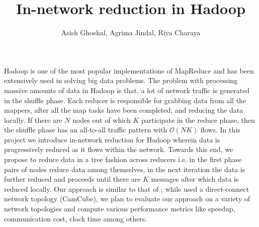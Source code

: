 \documentclass{article}      %
\title{In-network reduction in Hadoop}
\author{Asish Ghoshal, Agrima Jindal, Riya Charaya}
\date{}
\begin{document}

\maketitle                   %

\section*{}
Hadoop is one of the most popular implementations of MapReduce and has been extensively used in solving big data problems.
The problem with processing massive amounts of data in Hadoop is that, a lot of network traffic is generated in the shuffle phase.
Each reducer is responsible for grabbing data from all the mappers, after all the map tasks have been completed, and
reducing the data locally. If there are $N$ nodes out of which $K$ participate in the reduce phase, 
then the shuffle phase has an all-to-all traffic pattern with $\mathcal{O}(NK)$ flows.
In this project we introduce in-network reduction for Hadoop wherein data is progressively reduced as it
flows within the network. Towards this end, we propose to reduce data in a tree fashion across reducers i.e. in the first phase
pairs of nodes reduce data among themselves, in the next iteration the data is further reduced and proceeds until there are $K$
messages after which data is reduced locally. Our approach is similar to that of \citep{costa2012camdoop}; while \citep{costa2012camdoop}
used a direct-connect network topology (CamCube), we plan to evaluate our approach on a variety of network topologies and compute
various performance metrics like speedup, communication cost, clock time among others.



\end{document}
